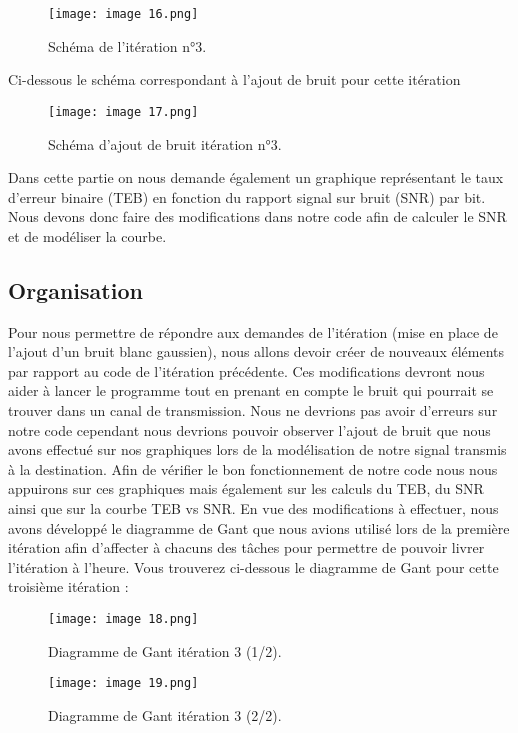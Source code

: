 \begin{figure}[h]
    \centering
    \texttt{[image: image 16.png]}
    \caption{\label{fig:image16}Schéma de l'itération n°3.}
\end{figure}

Ci-dessous le schéma correspondant à l'ajout de bruit pour cette itération

\begin{figure}[h]
    \centering
    \texttt{[image: image 17.png]}
    \caption{\label{fig:image17}Schéma d'ajout de bruit itération n°3.}
\end{figure}

Dans cette partie on nous demande également un graphique représentant le taux d'erreur binaire (TEB) en fonction du rapport signal sur bruit (SNR) par bit. Nous devons donc faire des modifications dans notre code afin de calculer le SNR et de modéliser la courbe.

\subsection{Organisation}

Pour nous permettre de répondre aux demandes de l'itération (mise en place de l'ajout d'un bruit blanc gaussien), nous allons devoir créer de nouveaux éléments par rapport au code de l'itération précédente. Ces modifications devront nous aider à lancer le programme tout en prenant en compte le bruit qui pourrait se trouver dans un canal de transmission. Nous ne devrions pas avoir d'erreurs sur notre code cependant nous devrions pouvoir observer l'ajout de bruit que nous avons effectué sur nos graphiques lors de la modélisation de notre signal transmis à la destination. Afin de vérifier le bon fonctionnement de notre code nous nous appuirons sur ces graphiques mais également sur les calculs du TEB, du SNR ainsi que sur la courbe TEB vs SNR.
En vue des modifications à effectuer, nous avons développé le diagramme de Gant que nous avions utilisé lors de la première itération afin d'affecter à chacuns des tâches pour permettre de pouvoir livrer l'itération à l'heure. Vous trouverez ci-dessous le diagramme de Gant pour cette troisième itération :

\begin{figure}[h]
    \centering
    \texttt{[image: image 18.png]}
    \caption{\label{fig:image18}Diagramme de Gant itération 3 (1/2).}
\end{figure}
\begin{figure}[h]
    \centering
    \texttt{[image: image 19.png]}
    \caption{\label{fig:image19}Diagramme de Gant itération 3 (2/2).}
\end{figure}

